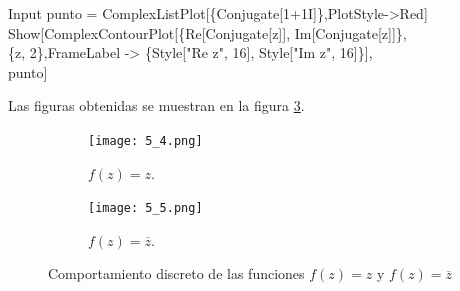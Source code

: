 \begin{Ejem}
	\begin{mmaCell}{Input}
		punto = ComplexListPlot[\{Conjugate[1+1I]\},PlotStyle->Red]\\Show[ComplexContourPlot[\{Re[Conjugate[z]], Im[Conjugate[z]]\},\\\{z, 2\},FrameLabel -> \{Style["Re z", 16], Style["Im z", 16]\}],\\punto]
	\end{mmaCell}
	
	Las figuras obtenidas se muestran en la figura \ref{fig:ej_5D}.
	
	\begin{figure}[htbp!]
	\centering
	\begin{subfigure}{0.3\textwidth}
		\texttt{[image: 5\_4.png]}
		\caption{$f(z)=z$.}
		\label{fig:ej_5_4}
	\end{subfigure}
	\begin{subfigure}{0.3\textwidth}
		\texttt{[image: 5\_5.png]}
		\caption{$f(z)=\overline{z}$.}
		\label{fig:ej_5_5}
	\end{subfigure}
	\caption{Comportamiento discreto de las funciones $f(z)=z$ y $f(z)=\overline{z}$}
	\label{fig:ej_5D}
\end{figure}
\end{Ejem} 



